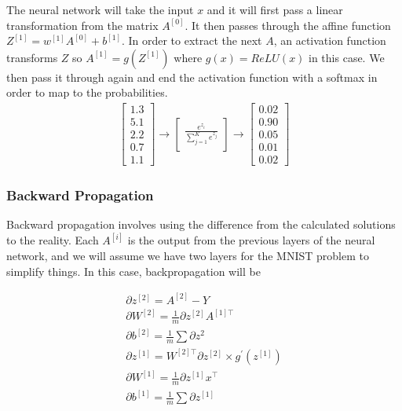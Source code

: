 The neural network will take the input $x$ and it will first pass a linear transformation from the matrix $A^{[0]}$. It then passes through the affine function $Z^{[1]} = w^{[1]} A^{[0]} + b^{[1]}$. In order to extract the next $A$, an activation function transforms $Z$ so $A^{[1]} = g(Z^{[1]})$ where $g(x) = ReLU(x)$ in this case. We then pass it through again and end the activation function with a softmax in order to map to the probabilities.
\begin{align}
  \begin{bmatrix}
     1.3 \\
     5.1 \\
     2.2 \\
     0.7 \\
     1.1
  \end{bmatrix}
  \to 
  \begin{bmatrix}
    \frac{e^{z_i}}{\sum_{j=1}^{K}e^{z_j}}
  \end{bmatrix}
  \to 
  \begin{bmatrix}
    0.02 \\
    0.90 \\
    0.05 \\
    0.01 \\
    0.02
  \end{bmatrix}
\end{align}

\subsubsection{Backward Propagation}
Backward propagation involves using the difference from the calculated solutions to the reality.  Each $A^{[i]}$ is the output from the previous layers of the neural network, and we will assume we have two layers for the MNIST problem to simplify things. In this case, backpropagation will be 

\begin{equation}
  \begin{aligned}
    \partial z^{[2]} = A^{[2]} - Y \\
    \partial W^{[2]} = \frac{1}{m} \partial z^{[2]} A^{[1] \top} \\
    \partial b^{[2]} = \frac{1}{m} \sum \partial z^{2} \\
    \partial z^{[1]} = W^{[2] \top} \partial z^{[2]} \times g^\prime(z^{[1]}) \\
    \partial W^{[1]} = \frac{1}{m} \partial z^{[1]} x^\top \\
    \partial b^{[1]} = \frac{1}{m} \sum \partial z^{[1]}
  \end{aligned}
\end{equation}

